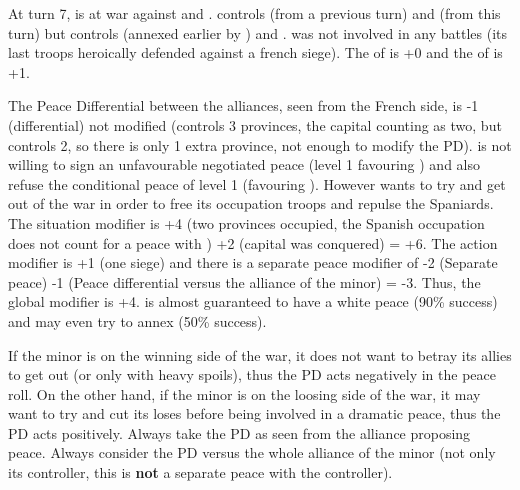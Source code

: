 \begin{exemple}
  At turn 7, \FRA is at war against \HIS and \paysSavoie. \FRA controls
  \provinceSavoia (from a previous turn) and \provinceBresse (from this turn)
  but \HIS controls \provinceArtois (annexed earlier by \FRA) and
  \provinceLanguedoc. \paysSavoie was not involved in any battles (its last
  troops heroically defended \provinceNice against a french siege). The \STAB
  of \FRA is +0 and the \STAB of \HIS is +1.

  The Peace Differential between the alliances, seen from the French side, is
  -1 (\STAB differential) not modified (\FRA controls 3 provinces, the capital
  counting as two, but \HIS controls 2, so there is only 1 extra province, not
  enough to modify the PD). \HIS is not willing to sign an unfavourable
  negotiated peace (level 1 favouring \FRA) and \FRA also refuse the
  conditional peace of level 1 (favouring \HIS). However \FRA wants to try and
  get \paysSavoie out of the war in order to free its occupation troops and
  repulse the Spaniards.  The situation modifier is +4 (two provinces
  occupied, the Spanish occupation does not count for a peace with
  \paysSavoie) +2 (capital was conquered) = +6. The action modifier is +1 (one
  siege) and there is a separate peace modifier of -2 (Separate peace) -1
  (Peace differential versus the alliance of the minor) = -3. Thus, the global
  modifier is +4. \FRA is almost guaranteed to have a white peace (90\%
  success) and may even try to annex \provinceBresse (50\% success).
\end{exemple}

\begin{designnote}
  If the minor is on the winning side of the war, it does not want to betray
  its allies to get out (or only with heavy spoils), thus the PD acts
  negatively in the peace roll. On the other hand, if the minor is on the
  loosing side of the war, it may want to try and cut its loses before being
  involved in a dramatic peace, thus the PD acts positively. Always take the
  PD as seen from the alliance proposing peace. Always consider the PD versus
  the whole alliance of the minor (not only its controller, this is
  \textbf{not} a separate peace with the controller).
\end{designnote}


